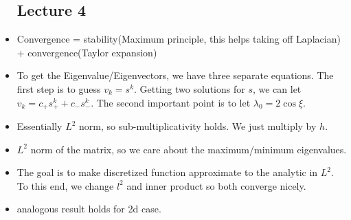 \documentclass{article}
\theoremstyle{remark}
\begin{document}
\begin{itemize}
\subsection*{Lecture 4}
    \item Convergence = stability(Maximum principle, this helps taking off Laplacian) + convergence(Taylor expansion)
    \item To get the Eigenvalue/Eigenvectors, we have three separate equations. The first step is to guess $v_k=s^k$. Getting two solutions for $s$, we can let $v_k=c_+ s^k_+ +c_- s^k_-$. The second important point is to let $\lambda_0=2\cos \xi$.
    \item Essentially $L^2$ norm, so sub-multiplicativity holds. We just multiply by $h$.
    \item $L^2$ norm of the matrix, so we care about the maximum/minimum eigenvalues.
    \item The goal is to make discretized function approximate to the analytic in $L^2$. To this end, we change $l^2$ and inner product so both converge nicely.
    \item analogous result holds for 2d case. 


\end{itemize}
\end{document}
